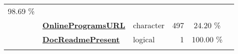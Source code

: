 \documentclass[]{article}
\begin{document}
\begin{longtable}[]{@{}lllrcl@{}}
\begin{minipage}[t]{0.10\columnwidth}
98.69 \%\strut
\end{minipage} & \begin{minipage}[t]{0.12\columnwidth}\raggedright\strut
\strut
\end{minipage}\tabularnewline
\begin{minipage}[t]{0.07\columnwidth}\raggedright\strut
\strut
\end{minipage} & \begin{minipage}[t]{0.35\columnwidth}\raggedright\strut
\textbf{\protect\hyperlink{onlineprogramsurl}{OnlineProgramsURL}}\strut
\end{minipage} & \begin{minipage}[t]{0.11\columnwidth}\raggedright\strut
character\strut
\end{minipage} & \begin{minipage}[t]{0.10\columnwidth}\raggedleft\strut
497\strut
\end{minipage} & \begin{minipage}[t]{0.10\columnwidth}\centering\strut
24.20 \%\strut
\end{minipage} & \begin{minipage}[t]{0.12\columnwidth}\raggedright\strut
\strut
\end{minipage}\tabularnewline
\begin{minipage}[t]{0.07\columnwidth}\raggedright\strut
\strut
\end{minipage} & \begin{minipage}[t]{0.35\columnwidth}\raggedright\strut
\textbf{\protect\hyperlink{docreadmepresent}{DocReadmePresent}}\strut
\end{minipage} & \begin{minipage}[t]{0.11\columnwidth}\raggedright\strut
logical\strut
\end{minipage} & \begin{minipage}[t]{0.10\columnwidth}\raggedleft\strut
1\strut
\end{minipage} & \begin{minipage}[t]{0.10\columnwidth}\centering\strut
100.00 \%\strut
\end{minipage} & \begin{minipage}[t]{0.12\columnwidth}\raggedright\strut
\strut
\end{minipage}\tabularnewline
\begin{minipage}[t]{0.07\columnwidth}\raggedright\strut
\strut
\end{minipage} & \begin{minipage}[t]{0.35\columnwidth}\raggedright\strut

\end{minipage}
\end{longtable}
\end{document}
